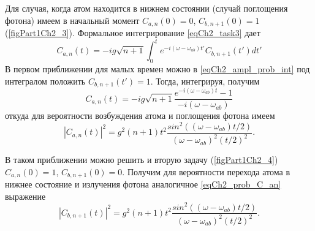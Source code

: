 

Для случая, когда атом находится в нижнем состоянии (случай поглощения
фотона) имеем в начальный момент  
$C_{a, n}\left(0\right) = 0$, $C_{b, n + 1}\left(0\right) = 1$
(\autoref{figPart1Ch2_3}). Формальное интегрирование \eqref{eqCh2_task3} дает  
\begin{equation}
C_{a,n}\left(t\right) = -i g \sqrt{n + 1}
\int_0^t e^{-i \left(\omega - \omega_{ab}\right)t'} 
C_{b, n + 1}\left(t'\right) dt'
\label{eqCh2_ampl_prob_int}
\end{equation}
В первом приближении для малых времен можно в
\eqref{eqCh2_ampl_prob_int} под интегралом 
положить $C_{b, n + 1}\left(t'\right) = 1$.  Тогда, интегрируя,
получим  
\begin{equation}
C_{a,n}\left(t\right) = -i g \sqrt{n + 1}
\frac{e^{-i \left(\omega - \omega_{ab}\right)t} - 1}
{-i \left(\omega - \omega_{ab}\right)}
\end{equation}
откуда для вероятности возбуждения атома и поглощения фотона имеем
\begin{equation}
\left|C_{a,n}\left(t\right)\right|^2 = g^2 \left(n + 1\right) t^2
\frac{sin^2\left(\left(\omega - \omega_{ab}\right)t/2\right)}
{\left(\omega - \omega_{ab}\right)^2\left(t/2\right)^2}. 
\label{eqCh2_prob_C_an}
\end{equation}



В таком приближении можно решить и вторую задачу (\autoref{figPart1Ch2_4}) 
$C_{a, n}\left(0\right) = 1$, $C_{b, n + 1}\left(0\right) = 0$. 
Получим для вероятности перехода атома в нижнее состояние и излучения
фотона аналогичное \eqref{eqCh2_prob_C_an} выражение  
\begin{equation}
\left|C_{b, n + 1}\left(t\right)\right|^2 = g^2 \left(n + 1\right) t^2
\frac{sin^2\left(\left(\omega - \omega_{ab}\right)t/2\right)}
{\left(\omega - \omega_{ab}\right)^2\left(t/2\right)^2}.
\label{eqCh2_prob_C_bn}
\end{equation}

